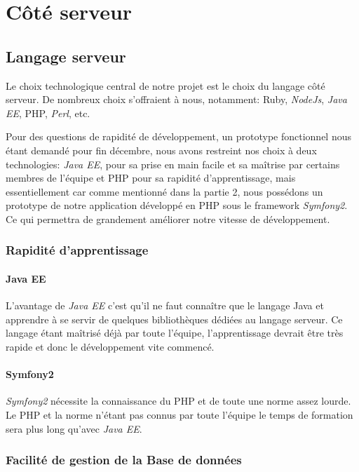 \section{Côté serveur}

\subsection{Langage serveur}
Le choix technologique central de notre projet est le choix du langage côté serveur. De nombreux choix s'offraient à nous, notamment: Ruby, \textit{NodeJs}, \textit{Java EE}, PHP, \textit{Perl}, etc.

Pour des questions de rapidité de développement, un prototype fonctionnel nous étant demandé pour fin décembre, nous avons restreint nos choix à deux technologies: \textit{Java EE}, pour sa prise en main facile et sa maîtrise par certains membres de l'équipe et PHP pour sa rapidité d'apprentissage, mais essentiellement car comme mentionné dans la partie 2, nous possédons un prototype de notre application développé en PHP sous le framework \textit{Symfony2}. Ce qui permettra de grandement améliorer notre vitesse de développement.\\


\subsubsection{Rapidité d'apprentissage}
\paragraph{Java EE}
L'avantage de \textit{Java EE} c'est qu'il ne faut connaître que le langage Java et apprendre à se servir de quelques bibliothèques dédiées au langage serveur.
Ce langage étant maîtrisé déjà par toute l'équipe, l'apprentissage devrait être très rapide et donc le développement vite commencé.

\paragraph{Symfony2}
\textit{Symfony2} nécessite la connaissance du PHP et de toute une norme assez lourde. 
Le PHP et la norme n'étant pas connus par toute l'équipe le temps de formation sera plus long qu'avec \textit{Java EE}.

\subsubsection{Facilité de gestion de la Base de données}
